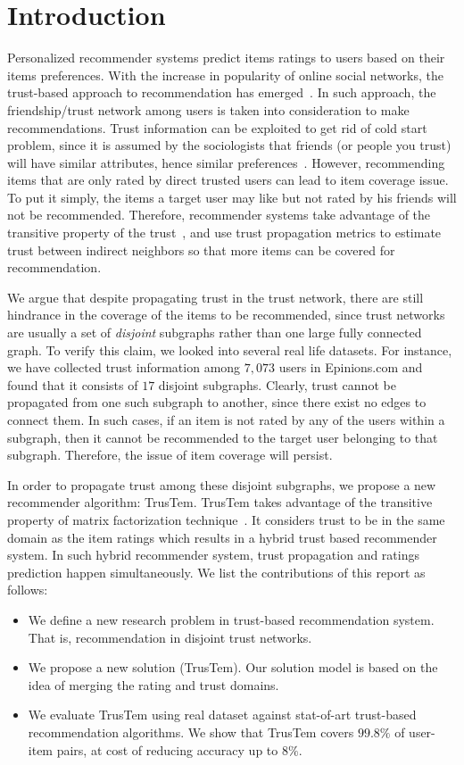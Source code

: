 \documentclass[11pt, conference, onecolumn]{IEEEtran}
\begin{document}
\section{Introduction} \label{sec:intro}
Personalized recommender systems predict items ratings to users based on their items preferences. With the increase in popularity of online social networks, the trust-based approach to recommendation has emerged~\cite{Massa:2007,Golbeck:2005,Jamali:2009,Jamali:2010}. In such approach, the friendship/trust network among users is taken into consideration to make recommendations. Trust information can be exploited to get rid of cold start problem, since it is assumed by the sociologists that friends (or people you trust) will have similar attributes, hence similar preferences~\cite{Friedkin:1998}. However, recommending items that are only rated by direct trusted users can lead to item coverage issue. To put it simply, the items a target user may like but not rated by his friends will not be recommended. Therefore, recommender systems take advantage of the transitive property of the trust~\cite{Andersen:2008}, and use trust propagation metrics to estimate trust between indirect neighbors so that more items can be covered for recommendation. 

We argue that despite propagating trust in the trust network, there are still hindrance in the coverage of the items to be recommended, since trust networks are usually a set of \textit{disjoint} subgraphs rather than one large fully connected graph. To verify this claim, we looked into several real life datasets. For instance, we have collected trust information among $7,073$ users in Epinions.com and found that it consists of $17$ disjoint subgraphs. Clearly, trust cannot be propagated from one such subgraph to another, since there exist no edges to connect them. In such cases, if an item is not rated by any of the users within a subgraph, then it cannot be recommended to the target user belonging to that subgraph. Therefore, the issue of item coverage will persist.

In order to propagate trust among these disjoint subgraphs, we propose a new recommender algorithm: TrusTem. TrusTem takes advantage of the transitive property of matrix factorization technique~\cite{Koren:2009}. It considers trust to be in the same domain as the item ratings which results in a hybrid trust based recommender system. In such hybrid recommender system, trust propagation and ratings prediction happen simultaneously. We list the contributions of this report as follows:
\begin{itemize}
\item We define a new research problem in trust-based recommendation system. That is, recommendation in disjoint trust networks.
\item We propose a new solution (TrusTem). Our solution model is based on the idea of merging the rating and trust domains.
\item We evaluate TrusTem using real dataset against stat-of-art trust-based recommendation algorithms. We show that TrusTem covers $99.8\%$ of user-item pairs, at cost of reducing accuracy up to $8\%$.
\end{itemize}
\end{document}
